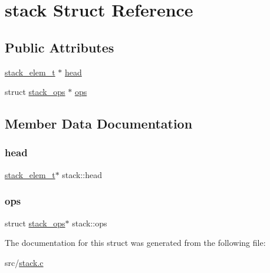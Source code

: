 \hypertarget{structstack}{}\section{stack Struct Reference}
\label{structstack}
\subsection*{Public Attributes}
\begin{DoxyCompactItemize}
\item 
\mbox{\hyperlink{stack_8c_ac5cddd37a51910f4e5c2ca6cf371b961}{stack\+\_\+elem\+\_\+t}} $\ast$ \mbox{\hyperlink{structstack_a8eb3ef6cb7f4938ed141fe41a3d3c8a6}{head}}
\item 
struct \mbox{\hyperlink{structstack__ops}{stack\+\_\+ops}} $\ast$ \mbox{\hyperlink{structstack_acc247b59c998af19a400c17a409d0823}{ops}}
\end{DoxyCompactItemize}


\subsection{Member Data Documentation}
\mbox{\label{structstack_a8eb3ef6cb7f4938ed141fe41a3d3c8a6}} 
\subsubsection{\texorpdfstring{head}{head}}
{\footnotesize\ttfamily \mbox{\hyperlink{stack_8c_ac5cddd37a51910f4e5c2ca6cf371b961}{stack\+\_\+elem\+\_\+t}}$\ast$ stack\+::head}

\mbox{\label{structstack_acc247b59c998af19a400c17a409d0823}} 
\subsubsection{\texorpdfstring{ops}{ops}}
{\footnotesize\ttfamily struct \mbox{\hyperlink{structstack__ops}{stack\+\_\+ops}}$\ast$ stack\+::ops}



The documentation for this struct was generated from the following file\+:\begin{DoxyCompactItemize}
\item 
src/\mbox{\hyperlink{stack_8c}{stack.\+c}}\end{DoxyCompactItemize}
